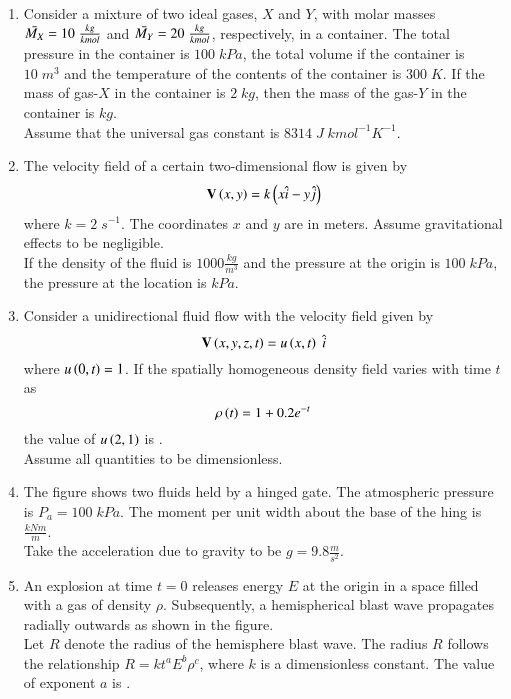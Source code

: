 \documentclass[journal,12pt,onecolumn]{IEEEtran}
\theoremstyle{remark}
\begin{document}
\begin{enumerate}[start=53]
\item Consider a mixture of two ideal gases, $X$ and $Y$, with molar masses $\Bar{M_X}=10\;\frac{kg}{kmol}$ and $\Bar{M_Y}=20\;\frac{kg}{kmol}$, respectively, in a container. The total pressure in the container is $100\;kPa$, the total volume if the container is $10\;m^3$ and the temperature of the contents of the container is $300\;K$. If the mass of gas-$X$ in the container is $2\;kg$, then the mass of the gas-$Y$ in the container is \underline{\hspace{2cm}}$kg$.\\ Assume that the universal gas constant is $8314\;J\;kmol^{-1}K^{-1}$.
\item The velocity field of a certain two-dimensional flow is given by $$\textbf{V}\left(x,y\right)=k\left(x\hat{i}-y\hat{j}\right)$$ where $k=2\;s^{-1}$. The coordinates $x$ and $y$ are in meters. Assume gravitational effects to be negligible.\\If the density of the fluid is $1000\frac{kg}{m^3}$ and the pressure at the origin is $100\;kPa$, the pressure at the location  is \underline{\hspace{2cm}} $kPa$.\\ 
\item Consider a unidirectional fluid flow with the velocity field given by $$\textbf{V}\left(x,y,z,t\right)=u\left(x,t\right)\;\hat{i}$$ where $u\left(0,t\right)=1$. If the spatially homogeneous density field varies with time $t$ as $$\rho\left(t\right)=1+0.2e^{-t}$$ the value of $u\left(2,1\right)$ is \underline{\hspace{2cm}}.\\ Assume all quantities to be dimensionless. 
\item The figure shows two fluids held by a hinged gate. The atmospheric pressure is $P_a=100\;kPa$. The moment per unit width about the base of the hing is \underline{\hspace{2cm}} $\frac{kNm}{m}$.\\ Take the acceleration due to gravity to be $g=9.8\frac{m}{s^2}$.

\item An explosion at time $t=0$ releases energy $E$ at the origin in a space filled with a gas of density $\rho$. Subsequently, a hemispherical blast wave propagates radially outwards as shown in the figure.\\ Let $R$ denote the radius of the hemisphere blast wave. The radius $R$ follows the relationship $R=kt^aE^b\rho^c$, where $k$ is a dimensionless constant. The value of exponent $a$ is \underline{\hspace{2cm}}.\\ \\

\end{enumerate}
\end{document}
